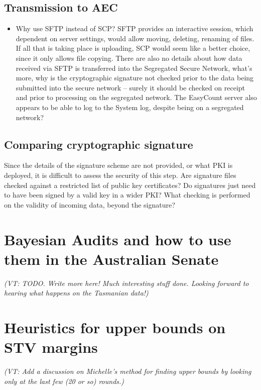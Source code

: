 \documentclass[10pt,a4paper]{article}
\newcommand{\VTNote}[1]{{\it(VT: #1)}}
\begin{document}
\subsection{Transmission to AEC}
\begin{itemize}
\item Why use SFTP instead of SCP? SFTP provides an interactive session, which dependent on server settings, would allow moving, deleting, renaming of files. If all that is taking place is uploading, SCP would seem like a better choice, since it only allows file copying. There are also no details about how data received via SFTP is transferred into the Segregated Secure Network, what’s more, why is the cryptographic signature not checked prior to the data being submitted into the secure network – surely it should be checked on receipt and prior to processing on the segregated network. The EasyCount server also appears to be able to log to the System log, despite being on a segregated network?
\end{itemize}

\subsection{Comparing cryptographic signature}
Since the details of the signature scheme are not provided, or what PKI is deployed, it is difficult to assess the security of this step. Are signature files checked against a restricted list of public key certificates? Do signatures just need to have been signed by a valid key in a wider PKI? What checking is performed on the validity of incoming data, beyond the signature?



\section{Bayesian Audits and how to use them in the Australian Senate}  \label{sec:bayes}
\VTNote{TODO.  Write more here!  Much interesting stuff done.  Looking forward to hearing what happens on the Tasmanian data!}


\section{Heuristics for upper bounds on STV margins}  \label{sec:winnerElimination}
\VTNote{Add a discussion on Michelle's method for finding upper bounds by looking only at the last few (20 or so) rounds.}
\end{document}
